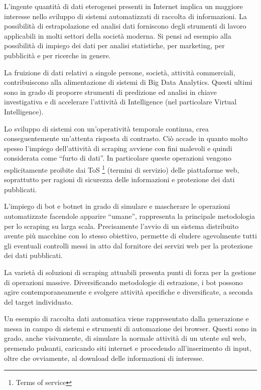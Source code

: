 L'ingente quantit\`a di dati eterogenei presenti in Internet implica un maggiore interesse nello sviluppo di sistemi automatizzati di raccolta di informazioni. La possibilit\`a di estrapolazione ed analisi dati forniscono degli strumenti di lavoro applicabili in molti settori della societ\`a moderna. Si pensi ad esempio alla possibilit\`a di impiego dei dati per analisi statistiche, per marketing, per pubblicit\`a e per ricerche in genere.

La fruizione di dati relativi a singole persone, societ\`a, attivit\`a commerciali, contribuiscono alla alimentazione di sistemi di Big Data Analytics. Questi ultimi sono in grado di proporre strumenti di predizione ed analisi in chiave investigativa e di accelerare l'attivit\`a di Intelligence (nel particolare Virtual Intelligence).

Lo sviluppo di sistemi con un'operativit\`a temporale continua, crea conseguentemente un'attenta risposta di contrasto.
Ci\`o accade in quanto molto spesso l'impiego dell'attivit\`a di scraping avviene con fini malevoli e quindi considerata come ``furto di dati''. 
In particolare queste operazioni vengono esplicitamente proibite dai ToS \footnote{Terms of service} (termini di servizio) delle piattaforme web, soprattutto per ragioni di sicurezza delle informazioni e protezione dei dati pubblicati.

L'impiego di bot e botnet in grado di simulare e mascherare le operazioni automatizzate facendole apparire ``umane'', rappresenta la principale metodologia per lo scraping su larga scala. Precisamente l'avvio di un sistema distribuito avente pi\`u macchine con lo stesso obiettivo, permette di eludere agevolmente tutti gli eventuali controlli messi in atto dal fornitore dei servizi web per la protezione dei dati pubblicati. 

La variet\`a di soluzioni di scraping attuabili presenta punti di forza per la gestione di operazioni massive. Diversificando metodologie di estrazione, i bot possono agire contemporaneamente e svolgere attivit\`a specifiche e diversificate, a seconda del target individuato.

Un esempio di raccolta dati automatica viene rappresentato dalla generazione e messa in campo di sistemi e strumenti di automazione dei browser. Questi sono in grado, anche visivamente, di simulare la normale attivit\`a di un utente sul web, premendo pulsanti, caricando siti internet e procedendo all'inserimento di input, oltre che ovviamente, al download delle informazioni di interesse. 


